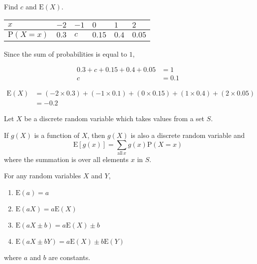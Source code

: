 \documentclass[11pt,a4paper]{book}
\begin{document}
\begin{example}[Expectation of $X$]

Find $c$ and $\text{E}\left(X\right)$.
\begin{center}
\setlength{\extrarowheight}{2pt}%
\begin{tabular}[t]{|>{\centering}m{2cm}|>{\centering}m{1.5cm}|>{\centering}m{1.5cm}|>{\centering}m{1.5cm}|>{\centering}m{1.5cm}|>{\centering}m{1.5cm}|}
\hline
$x$ & $-2$ & $-1$ & $0$ & $1$ & $2$\tabularnewline
\hline
$\text{P}\left(X=x\right)$ & $0.3$ & $c$ & $0.15$ & $0.4$ & $0.05$\tabularnewline
\hline
\end{tabular}
\par\end{center}

\Solution

Since the sum of probabilities is equal to $1$,

\begin{align*}
0.3+c+0.15+0.4+0.05 & =1\\
c & =0.1
\end{align*}

\begin{align*}
\text{E}\left(X\right) & =\left(-2\times0.3\right)+\left(-1\times0.1\right)+\left(0\times0.15\right)+\left(1\times0.4\right)+\left(2\times0.05\right)\\
 & =-0.2
\end{align*}

\end{example}

\begin{tcolorbox}[colback=blue!5, colframe=black, boxrule=.4pt, sharpish corners]

Let $X$ be a discrete random variable which takes values from a set
$S$.

If $g\left(X\right)$ is a function of $X$, then $g\left(X\right)$
is also a discrete random variable and
\[
\text{E}\left[g\left(x\right)\right]=\sum_{\text{all}\,x}g\left(x\right)\text{P}\left(X=x\right)
\]
where the summation is over all elements $x$ in $S$.

For any random variables $X$ and $Y$,

\begin{enumerate}[label=(\alph*)]

\item  $\text{E}\left(a\right)=a$

\item  $\text{E}\left(aX\right)=a\text{E}\left(X\right)$

\item  $\text{E}\left(aX\pm b\right)=a\text{E}\left(X\right)\pm b$

\item  $\text{E}\left(aX\pm bY\right)=a\text{E}\left(X\right)\pm b\text{E}\left(Y\right)$

\end{enumerate}

where $a$ and $b$ are constants.

\end{tcolorbox}
\end{document}
